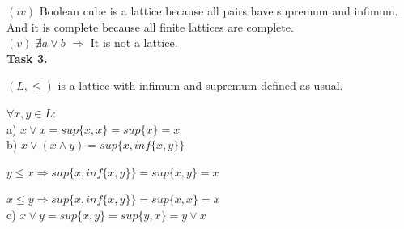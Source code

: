 \documentclass{article}
\begin{document}
$(iv)$ Boolean cube is a lattice because all pairs have supremum and infimum. And it is complete because all finite lattices are complete.\\

$(v)$ $\nexists a \lor b$ $\Rightarrow$ It is not a lattice.\\

\textbf{Task 3.}

$(L, \leq)$ is a lattice with infimum and supremum defined as usual.

$\forall x,y \in L:$\\

a) $x \lor x = sup\{x, x\} = sup\{x\} = x$\\

b) $x \lor (x \land y) = sup\{x, inf\{x,y\}\}$

$y \leq x \Rightarrow sup\{x, inf\{x,y\}\} = sup\{x,y\} = x$

$x \leq y \Rightarrow sup\{x, inf\{x,y\}\} = sup\{x,x\} = x$\\

c) $x \lor y = sup\{x, y\} = sup\{y, x\} = y \lor x$

 
\end{document}
